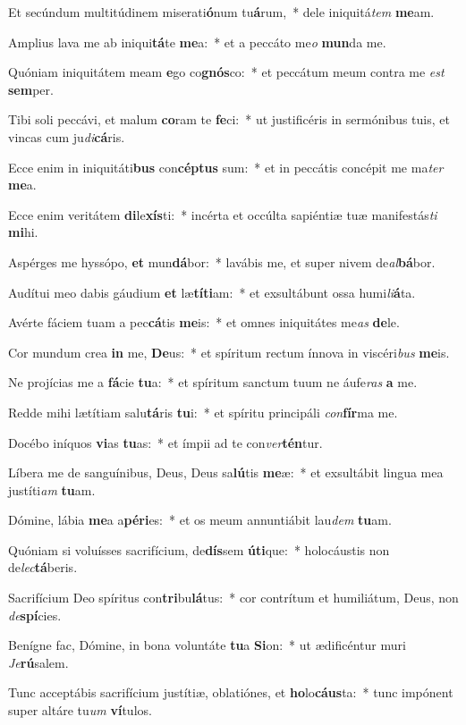 \item Et secúndum multitúdinem miserati\textbf{ó}num tu\textbf{á}rum,~* dele iniquitá\textit{tem} \textbf{me}am.
\item Amplius lava me ab iniqui\textbf{tá}te \textbf{me}a:~* et a peccáto me\textit{o} \textbf{mun}da me.
\item Quóniam iniquitátem meam \textbf{e}go co\textbf{gnós}co:~* et peccátum meum contra me \textit{est} \textbf{sem}per.
\item Tibi soli peccávi, et malum \textbf{co}ram te \textbf{fe}ci:~* ut justificéris in sermónibus tuis, et vincas cum ju\textit{di}\textbf{cá}ris.
\item Ecce enim in iniquitáti\textbf{bus} con\textbf{cép}\textbf{tus} sum:~* et in peccátis concépit me ma\textit{ter} \textbf{me}a.
\item Ecce enim veritátem \textbf{di}le\textbf{xís}ti:~* incérta et occúlta sapiéntiæ tuæ manifestás\textit{ti} \textbf{mi}hi.
\item Aspérges me hyssópo, \textbf{et} mun\textbf{dá}bor:~* lavábis me, et super nivem de\textit{al}\textbf{bá}bor.
\item Audítui meo dabis gáudium \textbf{et} læ\textbf{tí}\textbf{ti}am:~* et exsultábunt ossa humi\textit{li}\textbf{á}ta.
\item Avérte fáciem tuam a pec\textbf{cá}tis \textbf{me}is:~* et omnes iniquitátes me\textit{as} \textbf{de}le.
\item Cor mundum crea \textbf{in} me, \textbf{De}us:~* et spíritum rectum ínnova in viscéri\textit{bus} \textbf{me}is.
\item Ne projícias me a \textbf{fá}cie \textbf{tu}a:~* et spíritum sanctum tuum ne áufe\textit{ras} \textbf{a} me.
\item Redde mihi lætítiam salu\textbf{tá}ris \textbf{tu}i:~* et spíritu principáli \textit{con}\textbf{fír}ma me.
\item Docébo iníquos \textbf{vi}as \textbf{tu}as:~* et ímpii ad te con\textit{ver}\textbf{tén}tur.
\item Líbera me de sanguínibus, Deus, Deus sa\textbf{lú}tis \textbf{me}æ:~* et exsultábit lingua mea justíti\textit{am} \textbf{tu}am.
\item Dómine, lábia \textbf{me}a a\textbf{pé}\textbf{ri}es:~* et os meum annuntiábit lau\textit{dem} \textbf{tu}am.
\item Quóniam si voluísses sacrifícium, de\textbf{dís}sem \textbf{ú}\textbf{ti}que:~* holocáustis non de\textit{lec}\textbf{tá}beris.
\item Sacrifícium Deo spíritus con\textbf{tri}bu\textbf{lá}tus:~* cor contrítum et humiliátum, Deus, non \textit{de}\textbf{spí}cies.
\item Benígne fac, Dómine, in bona voluntáte \textbf{tu}a \textbf{Si}on:~* ut ædificéntur muri \textit{Je}\textbf{rú}salem.
\item Tunc acceptábis sacrifícium justítiæ, oblatiónes, et \textbf{ho}lo\textbf{cáus}ta:~* tunc impónent super altáre tu\textit{um} \textbf{ví}tulos.
